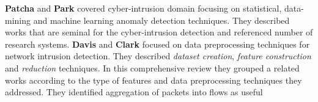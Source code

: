 %
\textbf{Patcha} and \textbf{Park} \cite{patcha2007anomaly} covered cyber-intrusion domain focusing on statistical,
data-mining and machine learning anomaly detection techniques. 
They described works that are seminal for the cyber-intrusion detection and referenced number of research systems.
%
%
\textbf{Davis} and \textbf{Clark} \cite{davis2011data} focused on data preprocessing techniques for network
intrusion detection. They described \emph{dataset creation}, \emph{feature construction} and \emph{reduction}
techniques. 
In this comprehensive review they grouped a related works according to the type of features and
data preprocessing techniques they addressed. They identified aggregation of packets into flows as useful
